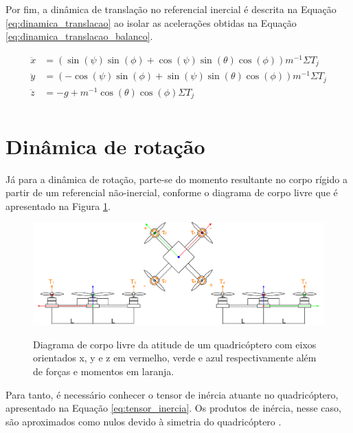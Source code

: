 \documentclass[main.tex]{subfiles}
\begin{document}
Por fim, a dinâmica de translação no referencial inercial é descrita na Equação \ref{eq:dinamica_translacao} ao isolar as acelerações obtidas na Equação \ref{eq:dinamica_translacao_balanco}.

\begin{equation}\label{eq:dinamica_translacao}
    \begin{split}
        \ddot{x} &= (\sin{(\psi)}\sin{(\phi)} + \cos{(\psi)}\sin{(\theta)}\cos{(\phi)})m^{-1}\Sigma T_j\\
        \ddot{y} &= (-\cos{(\psi)}\sin{(\phi)} + \sin{(\psi)}\sin{(\theta)}\cos{(\phi)})m^{-1}\Sigma T_j\\
        \ddot{z} &= -g + m^{-1}\cos{(\theta)}\cos{(\phi)}\Sigma T_j\\
    \end{split}
\end{equation}

\section{Dinâmica de rotação}

Já para a dinâmica de rotação, parte-se do momento resultante no corpo rígido a partir de um referencial não-inercial, conforme o diagrama de corpo livre que é apresentado na Figura \ref{fig:attitude_dcl}.

\begin{figure}[!h]
	\centering
	\caption{Diagrama de corpo livre da atitude de um quadricóptero com eixos orientados x, y e z em vermelho, verde e azul respectivamente além de forças e momentos em laranja.}
	\includegraphics[width=1\textwidth]{capitulos/modelagem/imgs/attitude_dcl.png}
	\label{fig:attitude_dcl}
\end{figure}

Para tanto, é necessário conhecer o tensor de inércia atuante no quadricóptero, apresentado na Equação \ref{eq:tensor_inercia}. Os produtos de inércia, nesse caso, são aproximados como nulos devido à simetria do quadricóptero \cite{justificativa_inercia}.
\end{document}
